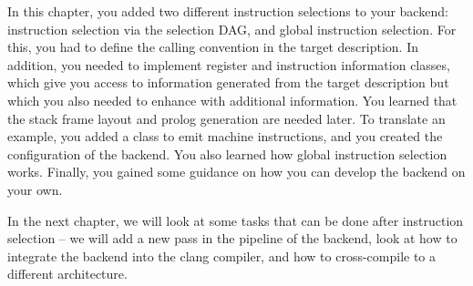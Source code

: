 In this chapter, you added two different instruction selections to your backend: instruction selection via the selection DAG, and global instruction selection. For this, you had to define the calling convention in the target description. In addition, you needed to implement register and instruction information classes, which give you access to information generated from the target description but which you also needed to enhance with additional information. You learned that the stack frame layout and prolog generation are needed later. To translate an example, you added a class to emit machine instructions, and you created the configuration of the backend. You also learned how global instruction selection works. Finally, you gained some guidance on how you can develop the backend on your own.

In the next chapter, we will look at some tasks that can be done after instruction selection – we will add a new pass in the pipeline of the backend, look at how to integrate the backend into the clang compiler, and how to cross-compile to a different architecture.

